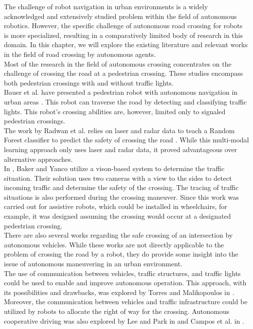 The challenge of robot navigation in urban environments is a widely acknowledged and extensively studied problem within the field of autonomous robotics. However, the specific challenge of autonomous road crossing for robots is more specialized, resulting in a comparatively limited body of research in this domain. In this chapter, we will explore the existing literature and relevant works in the field of road crossing by autonomous agents.\\
Most of the research in the field of autonomous crossing concentrates on the challenge of crossing the road at a pedestrian crossing. These studies encompass both pedestrian crossings with and without traffic lights.\\
Bauer et al. have presented a pedestrian robot with autonomous navigation in urban areas \cite{Bauer}. This robot can traverse the road by detecting and classifying traffic lights. This robot's crossing abilities are, however, limited only to signaled pedestrian crossings.\\
The work by Radwan et al. relies on laser and radar data to teach a Random Forest classifier to predict the safety of crossing the road \cite{Radwan}. While this multi-modal learning approach only uses laser and radar data, it proved advantageous over alternative approaches.\\
In \cite{Baker}, Baker and Yanco utilize a vison-based system to determine the traffic situation. Their solution uses two cameras with a view to the sides to detect incoming traffic and determine the safety of the crossing. The tracing of traffic situations is also performed during the crossing maneuver. Since this work was carried out for assistive robots, which could be installed in wheelchairs, for example, it was designed assuming the crossing would occur at a designated pedestrian crossing.\\
There are also several works regarding the safe crossing of an intersection by autonomous vehicles. While these works are not directly applicable to the problem of crossing the road by a robot, they do provide some insight into the issue of autonomous maneuvering in an urban environment.\\
The use of communication between vehicles, traffic structures, and traffic lights could be used to enable and improve autonomous operation. This approach, with its possibilities and drawbacks, was explored by Torres and Malikopoulos in \cite{CAV}. Moreover, the communication between vehicles and traffic infrastructure could be utilized by robots to allocate the right of way for the crossing. Autonomous cooperative driving was also explored by Lee and Park in \cite{Lee} and Campos et al. in \cite{Campos}.\\
